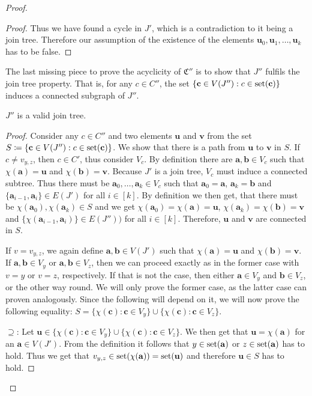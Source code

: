 \begin{proof}
\begin{proof}
		Thus we have found a cycle in $J'$, which is a contradiction to it being a join tree.
		Therefore our assumption of the existence of the elements $\mathbf u_0,\mathbf u_1,\dots,\mathbf u_k$ has to be false.
	\end{proof}
	
	The last missing piece to prove the acyclicity of $\mathfrak C''$ is to show that $J''$ fulfils the join tree property.
	That is, for any $c\in C''$, the set $\{\mathbf c\in V(J'') : c\in\operatorname{set}(\mathbf c)\}$ induces a connected subgraph of $J''$.
	
	\begin{claim}
		$J''$ is a valid join tree.
	\end{claim}
	\begin{proof}
		Consider any $c\in C''$ and two elements $\mathbf u$ and $\mathbf v$ from the set $S\coloneqq \{\mathbf c \in V(J'') : c\in \operatorname{set}(\mathbf c)\}$.
		We show that there is a path from $\mathbf u$ to $\mathbf v$ in $S$.
		If $c\neq v_{y,z}$, then $c\in C'$, thus consider $V_c$.
		By definition there are $\mathbf a,\mathbf b\in V_c$ such that $\chi(\mathbf a)=\mathbf u$ and $\chi(\mathbf b)=\mathbf v$.
		Because $J'$ is a join tree, $V_c$ must induce a connected subtree.
		Thus there must be $\mathbf a_0,\dots,\mathbf a_k\in V_c$ such that $\mathbf a_0=\mathbf a$, $\mathbf a_k=\mathbf b$ and $\{\mathbf a_{i-1},\mathbf a_i\}\in E(J')$ for all $i\in [k]$.
		By definition we then get, that there must be $\chi(\mathbf a_0),\chi(\mathbf a_k)\in S$ and we get $\chi(\mathbf a_0)=\chi(\mathbf a)=\mathbf u$, $\chi(\mathbf a_k)=\chi(\mathbf b)=\mathbf v$ and $\{\chi(\mathbf a_{i-1},\mathbf a_i)\}\in E(J''))$ for all $i\in[k]$.
		Therefore, $\mathbf u$ and $\mathbf v$ are connected in $S$.
		
		If $v=v_{y,z}$, we again define $\mathbf a,\mathbf b\in V(J')$ such that $\chi(\mathbf a)=\mathbf u$ and $\chi(\mathbf b)=\mathbf v$.
		If $\mathbf a,\mathbf b\in V_y$ or $\mathbf a,\mathbf b\in V_z$, then we can proceed exactly as in the former case with $v=y$ or $v=z$, respectively.
		If that is not the case, then either $\mathbf a\in V_y$ and $\mathbf b\in V_z$, or the other way round.
		We will only prove the former case, as the latter case can proven analogously.
		Since the following will depend on it, we will now prove the following equality: $S=\{\chi(\mathbf c) : \mathbf c\in V_y\}\cup \{\chi(\mathbf c) : \mathbf c\in V_z\}$.
		
		$\supseteq$:
		Let $\mathbf u \in \{\chi(\mathbf c) : \mathbf c\in V_y\}\cup \{\chi(\mathbf c) : \mathbf c\in V_z\}$.
		We then get that $\mathbf u = \chi(\mathbf a)$ for an $\mathbf a\in V(J')$.
		From the definition it follows that $y\in \operatorname{set}(\mathbf a)$ or $z\in \operatorname{set}(\mathbf a)$ has to hold.
		Thus we get that $v_{y,z}\in \operatorname{set}(\chi(\mathbf a))=\operatorname{set}(\mathbf u)$ and therefore $\mathbf u\in S$ has to hold.
		

\end{proof}
\end{proof}
